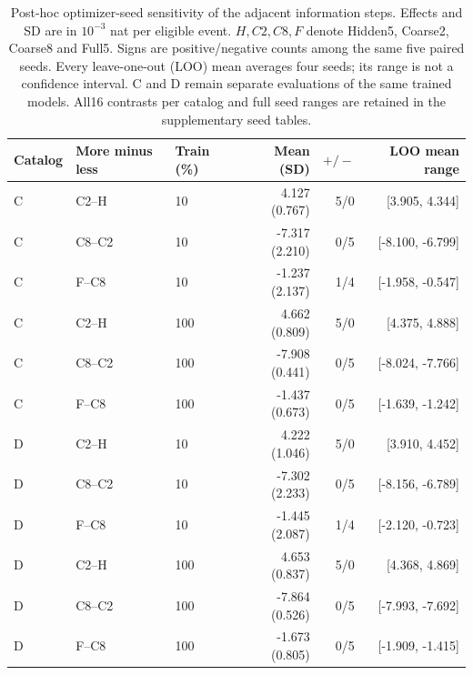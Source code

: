 \begin{table}[!htbp]
\centering
\small
\setlength{\tabcolsep}{3pt}
\caption{Post-hoc optimizer-seed sensitivity of the adjacent information steps. Effects and SD are in $10^{-3}$ nat per eligible event. $H,C2,C8,F$ denote Hidden5, Coarse2, Coarse8 and Full5. Signs are positive/negative counts among the same five paired seeds. Every leave-one-out (LOO) mean averages four seeds; its range is not a confidence interval. C and D remain separate evaluations of the same trained models. All16 contrasts per catalog and full seed ranges are retained in the supplementary seed tables.}\label{tab:seed_adjacent_summary}
\begin{tabular}{lllrrr}
\toprule Catalog & More minus less & Train (\%) & Mean (SD) & $+/-$ & LOO mean range\\ \midrule
C & C2--H & 10 & 4.127 (0.767) & 5/0 & [3.905, 4.344]\\
C & C8--C2 & 10 & -7.317 (2.210) & 0/5 & [-8.100, -6.799]\\
C & F--C8 & 10 & -1.237 (2.137) & 1/4 & [-1.958, -0.547]\\
C & C2--H & 100 & 4.662 (0.809) & 5/0 & [4.375, 4.888]\\
C & C8--C2 & 100 & -7.908 (0.441) & 0/5 & [-8.024, -7.766]\\
C & F--C8 & 100 & -1.437 (0.673) & 0/5 & [-1.639, -1.242]\\
D & C2--H & 10 & 4.222 (1.046) & 5/0 & [3.910, 4.452]\\
D & C8--C2 & 10 & -7.302 (2.233) & 0/5 & [-8.156, -6.789]\\
D & F--C8 & 10 & -1.445 (2.087) & 1/4 & [-2.120, -0.723]\\
D & C2--H & 100 & 4.653 (0.837) & 5/0 & [4.368, 4.869]\\
D & C8--C2 & 100 & -7.864 (0.526) & 0/5 & [-7.993, -7.692]\\
D & F--C8 & 100 & -1.673 (0.805) & 0/5 & [-1.909, -1.415]\\
\bottomrule
\end{tabular}
\end{table}
